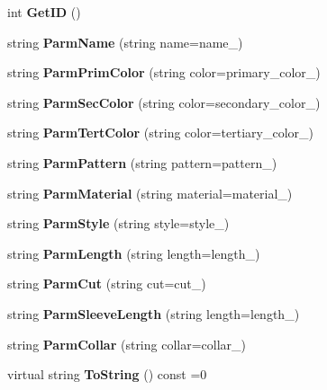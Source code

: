 \begin{DoxyCompactItemize}
\item 
\mbox{\label{classClothes_a3f6dac172f333126d19010f85ec44e4c}} 
int {\bfseries Get\+ID} ()
\item 
\mbox{\label{classClothes_a48787b979453e916476a28f703802d23}} 
string {\bfseries Parm\+Name} (string name=name\+\_\+)
\item 
\mbox{\label{classClothes_a0ee1ffc9971a7bdea45dac35808e168b}} 
string {\bfseries Parm\+Prim\+Color} (string color=primary\+\_\+color\+\_\+)
\item 
\mbox{\label{classClothes_a15a02c1fae95353d0d0b91694df70b61}} 
string {\bfseries Parm\+Sec\+Color} (string color=secondary\+\_\+color\+\_\+)
\item 
\mbox{\label{classClothes_ae6fc82beb6598ddfb2fc5e3253c55d8c}} 
string {\bfseries Parm\+Tert\+Color} (string color=tertiary\+\_\+color\+\_\+)
\item 
\mbox{\label{classClothes_a44f5372b75126d966c259cad7c0de4b3}} 
string {\bfseries Parm\+Pattern} (string pattern=pattern\+\_\+)
\item 
\mbox{\label{classClothes_a02f6501724c1001227e35c46424e248a}} 
string {\bfseries Parm\+Material} (string material=material\+\_\+)
\item 
\mbox{\label{classClothes_a58f99417f81e5d31ff90cbc830dce314}} 
string {\bfseries Parm\+Style} (string style=style\+\_\+)
\item 
\mbox{\label{classClothes_a5b8d63002853915190cdf7d8d94a1f6a}} 
string {\bfseries Parm\+Length} (string length=length\+\_\+)
\item 
\mbox{\label{classClothes_a63123eab288649126464d2f8944a0be1}} 
string {\bfseries Parm\+Cut} (string cut=cut\+\_\+)
\item 
\mbox{\label{classClothes_ad568215e8c1751e45438d67c87f05361}} 
string {\bfseries Parm\+Sleeve\+Length} (string length=length\+\_\+)
\item 
\mbox{\label{classClothes_abb6030ba8b16e1f6155a8697d3386311}} 
string {\bfseries Parm\+Collar} (string collar=collar\+\_\+)
\item 
\mbox{\label{classClothes_a953d143394e9a2c007ab0c3a638973cf}} 
virtual string {\bfseries To\+String} () const =0
\end{DoxyCompactItemize}
